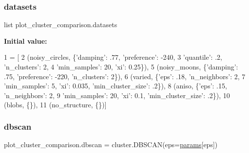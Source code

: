 \subsubsection{\texorpdfstring{datasets}{datasets}}
{\footnotesize\ttfamily list plot\+\_\+cluster\+\_\+comparison.\+datasets}

{\bfseries Initial value\+:}
\begin{DoxyCode}
1 =  [
2     (noisy\_circles, \{\textcolor{stringliteral}{'damping'}: .77, \textcolor{stringliteral}{'preference'}: -240,
3                      \textcolor{stringliteral}{'quantile'}: .2, \textcolor{stringliteral}{'n\_clusters'}: 2,
4                      \textcolor{stringliteral}{'min\_samples'}: 20, \textcolor{stringliteral}{'xi'}: 0.25\}),
5     (noisy\_moons, \{\textcolor{stringliteral}{'damping'}: .75, \textcolor{stringliteral}{'preference'}: -220, \textcolor{stringliteral}{'n\_clusters'}: 2\}),
6     (varied, \{\textcolor{stringliteral}{'eps'}: .18, \textcolor{stringliteral}{'n\_neighbors'}: 2,
7               \textcolor{stringliteral}{'min\_samples'}: 5, \textcolor{stringliteral}{'xi'}: 0.035, \textcolor{stringliteral}{'min\_cluster\_size'}: .2\}),
8     (aniso, \{\textcolor{stringliteral}{'eps'}: .15, \textcolor{stringliteral}{'n\_neighbors'}: 2,
9              \textcolor{stringliteral}{'min\_samples'}: 20, \textcolor{stringliteral}{'xi'}: 0.1, \textcolor{stringliteral}{'min\_cluster\_size'}: .2\}),
10     (blobs, \{\}),
11     (no\_structure, \{\})]
\end{DoxyCode}
\mbox{\label{namespaceplot__cluster__comparison_a1104a5ca141007136247a905c8d03d9d}} 
\subsubsection{\texorpdfstring{dbscan}{dbscan}}
{\footnotesize\ttfamily plot\+\_\+cluster\+\_\+comparison.\+dbscan = cluster.\+D\+B\+S\+C\+AN(eps=\hyperlink{namespaceplot__cluster__comparison_a5afe27ff875351ace28865d50f61c56a}{params}\mbox{[}\textquotesingle{}eps\textquotesingle{}\mbox{]})}

\mbox{\label{namespaceplot__cluster__comparison_aea1f3ae4fe0c1512de085b8bec71998c}} 
